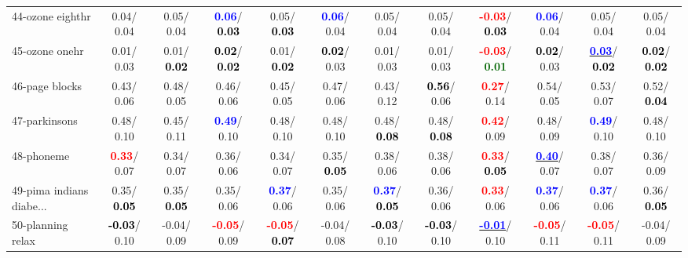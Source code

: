 \begin{table}[h]
\begin{center}
{\begin{tabular}{lc|c|c|c|c|c|c|c|c|c|c}
44-ozone eighthr &   0.04/  0.04 &   0.05/  0.04 & \textcolor{blue}{\textbf{  0.06}}/\textcolor{black}{\textbf{  0.03}} &   0.05/\textcolor{black}{\textbf{  0.03}} & \textcolor{blue}{\textbf{  0.06}}/  0.04 &   0.05/  0.04 &   0.05/  0.04 & \textcolor{red}{\textbf{ -0.03}}/\textcolor{black}{\textbf{  0.03}} & \textcolor{blue}{\textbf{  0.06}}/  0.04 &   0.05/  0.04 &   0.05/  0.04 \\
45-ozone onehr &   0.01/  0.03 &   0.01/\textcolor{black}{\textbf{  0.02}} & \textcolor{black}{\textbf{  0.02}}/\textcolor{black}{\textbf{  0.02}} &   0.01/\textcolor{black}{\textbf{  0.02}} & \textcolor{black}{\textbf{  0.02}}/  0.03 &   0.01/  0.03 &   0.01/  0.03 & \textcolor{red}{\textbf{ -0.03}}/\textcolor{darkgreen}{\textbf{  0.01}} & \textcolor{black}{\textbf{  0.02}}/  0.03 & \underline{\textcolor{blue}{\textbf{  0.03}}}/\textcolor{black}{\textbf{  0.02}} & \textcolor{black}{\textbf{  0.02}}/\textcolor{black}{\textbf{  0.02}} \\
46-page blocks &   0.43/  0.06 &   0.48/  0.05 &   0.46/  0.06 &   0.45/  0.05 &   0.47/  0.06 &   0.43/  0.12 & \textcolor{black}{\textbf{  0.56}}/  0.06 & \textcolor{red}{\textbf{  0.27}}/  0.14 &   0.54/  0.05 &   0.53/  0.07 &   0.52/\textcolor{black}{\textbf{  0.04}} \\ \hline
47-parkinsons &   0.48/  0.10 &   0.45/  0.11 & \textcolor{blue}{\textbf{  0.49}}/  0.10 &   0.48/  0.10 &   0.48/  0.10 &   0.48/\textcolor{black}{\textbf{  0.08}} &   0.48/\textcolor{black}{\textbf{  0.08}} & \textcolor{red}{\textbf{  0.42}}/  0.09 &   0.48/  0.09 & \textcolor{blue}{\textbf{  0.49}}/  0.10 &   0.48/  0.10 \\
48-phoneme & \textcolor{red}{\textbf{  0.33}}/  0.07 &   0.34/  0.07 &   0.36/  0.06 &   0.34/  0.07 &   0.35/\textcolor{black}{\textbf{  0.05}} &   0.38/  0.06 &   0.38/  0.06 & \textcolor{red}{\textbf{  0.33}}/\textcolor{black}{\textbf{  0.05}} & \underline{\textcolor{blue}{\textbf{  0.40}}}/  0.07 &   0.38/  0.07 &   0.36/  0.09 \\
49-pima indians diabe... &   0.35/\textcolor{black}{\textbf{  0.05}} &   0.35/\textcolor{black}{\textbf{  0.05}} &   0.35/  0.06 & \textcolor{blue}{\textbf{  0.37}}/  0.06 &   0.35/  0.06 & \textcolor{blue}{\textbf{  0.37}}/\textcolor{black}{\textbf{  0.05}} &   0.36/  0.06 & \textcolor{red}{\textbf{  0.33}}/  0.06 & \textcolor{blue}{\textbf{  0.37}}/  0.06 & \textcolor{blue}{\textbf{  0.37}}/  0.06 &   0.36/\textcolor{black}{\textbf{  0.05}} \\
50-planning relax & \textcolor{black}{\textbf{ -0.03}}/  0.10 &  -0.04/  0.09 & \textcolor{red}{\textbf{ -0.05}}/  0.09 & \textcolor{red}{\textbf{ -0.05}}/\textcolor{black}{\textbf{  0.07}} &  -0.04/  0.08 & \textcolor{black}{\textbf{ -0.03}}/  0.10 & \textcolor{black}{\textbf{ -0.03}}/  0.10 & \underline{\textcolor{blue}{\textbf{ -0.01}}}/  0.10 & \textcolor{red}{\textbf{ -0.05}}/  0.11 & \textcolor{red}{\textbf{ -0.05}}/  0.11 &  -0.04/  0.09 \\

\end{tabular}}
\end{center}
\end{table}
